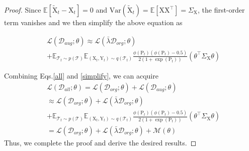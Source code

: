 \begin{proof}
Since $\mathbb E[\tilde{\mathrm{X}}_t - \mathrm{X}_t]=0$ and $\text{Var}(\tilde{\mathrm{X}}_t)=\mathbb E[\mathrm{X}\mathrm{X}^\top]=\Sigma_\mathrm{X}$, the first-order term vanishes and we then simplify the above equation as

\begin{equation}
\begin{aligned}
\label{simplify}
    &\mathcal{L}(\mathcal{D}_{aug};\theta) \approx \mathcal{L}(\bar{\lambda}\mathcal{D}_{org};\theta) \\
    & +  \mathbb E_{\mathcal{T}_t\sim p(\mathcal{T})}\mathbb E_{(\mathrm{X}_t,\mathrm{Y}_t)\sim q(\mathcal{T}_t)} \frac{\phi(\mathrm{P}_t)(\phi(\mathrm{P}_t)-0.5)}{2(1+\exp{(\mathrm{P}_t)})}(\theta^\top\Sigma_\mathrm{X}\theta)
\end{aligned}
\end{equation}


Combining Eqs.\ref{all} and \ref{simplify}, we can acquire
\begin{equation}
    \begin{aligned}
        &\mathcal{L}(\mathcal{D}_{all};\theta) = \mathcal{L}(\mathcal{D}_{org};\theta) + \mathcal{L}(\mathcal{D}_{aug};\theta) \\
        &\approx \mathcal{L}(\mathcal{D}_{org};\theta) + \mathcal{L}(\bar{\lambda}\mathcal{D}_{org};\theta) \\
        & +  \mathbb E_{\mathcal{T}_t\sim p(\mathcal{T})}\mathbb E_{(\mathrm{X}_t,\mathrm{Y}_t)\sim q(\mathcal{T}_t)} \frac{\phi(\mathrm{P}_t)(\phi(\mathrm{P}_t)-0.5)}{2(1+\exp{(\mathrm{P}_t)})}(\theta^\top\Sigma_\mathrm{X}\theta)\\
        &= \mathcal{L}(\mathcal{D}_{org};\theta) + \mathcal{L}(\bar{\lambda}\mathcal{D}_{org};\theta) + \mathcal{M}(\theta)
    \end{aligned}
\end{equation}
Thus, we complete the proof and derive the desired results.
\end{proof}


